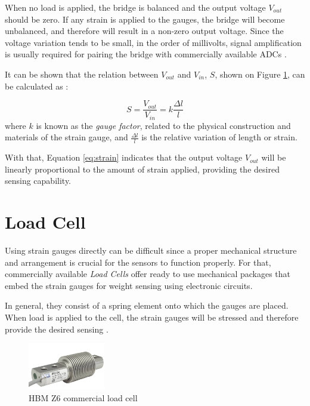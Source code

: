 \documentclass[openright]{normas-utf-tex} %
\begin{document}
When no load is applied, the bridge is balanced and the output voltage
$V_{out}$ should be zero. If any strain is applied to the gauges, the bridge
will become unbalanced, and therefore will result in a non-zero output voltage.
Since the voltage variation tends to be small, in the order of millivolts, signal amplification is usually
required for pairing the bridge with commercially available ADCs \cite{HorowitzHill2015}.

It can be shown that the relation between $V_{out}$ and $V_{in}$, $S$, shown on Figure \ref{fig:gauge2}, can be
calculated as \cite{Stefanescu}:

\begin{equation}
    \label{eq:strain}
    S = \frac{V_{out}}{V_{in}} = k\frac{\Delta l}{l}
\end{equation}
where $k$ is known as the \textit{gauge factor}, related to the physical
construction and materials of the strain gauge, and $\frac{\Delta l}{l}$ is the
relative variation of length or strain.

With that, Equation \ref{eq:strain} indicates that the output voltage $V_{out}$
will be linearly proportional to the amount of strain applied, providing the
desired sensing capability.

\section{Load Cell}

Using strain gauges directly can be difficult since a proper
mechanical structure and arrangement is crucial for the sensors to function
properly. For that, commercially available \textit{Load Cells} offer ready to
use mechanical packages that embed the strain gauges for weight sensing
using electronic circuits.

In general, they consist of a spring element onto which the gauges are placed.
When load is applied to the cell, the strain gauges will be stressed and
therefore provide the desired sensing \cite{HBM2022}.

\begin{figure}[H]
	\centering
	\includegraphics[width=0.3\textwidth]{./images/hbmz6.png}
	\caption[HBM Z6 commercial load cell]{HBM Z6 commercial load cell}
	\label{fig:gauge2}
\end{figure}
\end{document}
